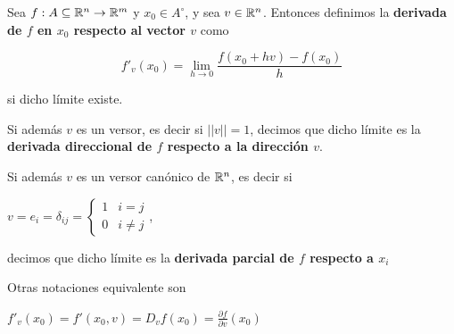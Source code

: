 \begin{definition}
Sea $f : A \subseteq \mathbb{R}^n \to \mathbb{R}^m$ y $x_0 \in A^{\circ}$, y sea $v \in \mathbb{R}^n$.  Entonces definimos la \textbf{derivada de $f$ en $x_0$ respecto al vector $v$} como

$$ \displaystyle f'_v(x_0) = \lim_{h \to 0} \frac{f(x_0 + hv) - f(x_0)}{h} $$

si dicho límite existe.

Si además $v$ es un versor, es decir si $||v|| = 1$, decimos que dicho límite es la \textbf{derivada direccional de $f$ respecto a la dirección $v$}. 

Si además $v$ es un versor canónico de $\mathbb{R}^n$, es decir si 

$v = e_i = \delta_{ij} = \begin{cases} 1 & i=j \\ 0 & i \neq j \end{cases}$, 

decimos que dicho límite es la \textbf{derivada parcial de $f$ respecto a $x_i$} 

Otras notaciones equivalente son

$ f'_v(x_0) = f'(x_0, v) = D_vf(x_0) = \frac{ \partial f}{\partial v} (x_0)$
\end{definition}

